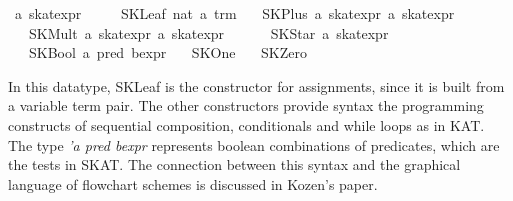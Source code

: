 \documentclass{llncs}
\begin{document}
\begin{isabellebody}
\isanewline
{}\isamarkupfalse%
\ {}a\ skat{}expr\ {}\isanewline
\ \ \ \ SKLeaf\ nat\ {}{}a\ trm{}\isanewline
\ \ {}\ SKPlus\ {}{}a\ skat{}expr{}\ {}{}a\ skat{}expr{}\ {}\ {}{}{}{}{}\ {}{}{}\isanewline
\ \ {}\ SKMult\ {}{}a\ skat{}expr{}\ {}{}a\ skat{}expr{}\ {}\ {}{}{}{}{}\ {}{}{}\isanewline
\ \ {}\ SKStar\ {}{}a\ skat{}expr{}\isanewline
\ \ {}\ SKBool\ {}{}a\ pred\ bexpr{}\isanewline
\ \ {}\ SKOne\isanewline
\ \ {}\ SKZero\isanewline
\end{isabellebody}

In this datatype, SKLeaf is the constructor for assignments, since it
is built from a variable term pair. The other constructors provide
syntax the programming constructs of sequential composition,
conditionals and while loops as in KAT. The type \textit{'a pred
  bexpr} represents boolean combinations of predicates, which are the
tests in SKAT. The connection between this syntax and the graphical
language of flowchart schemes is discussed in Kozen's paper.
\end{document}
